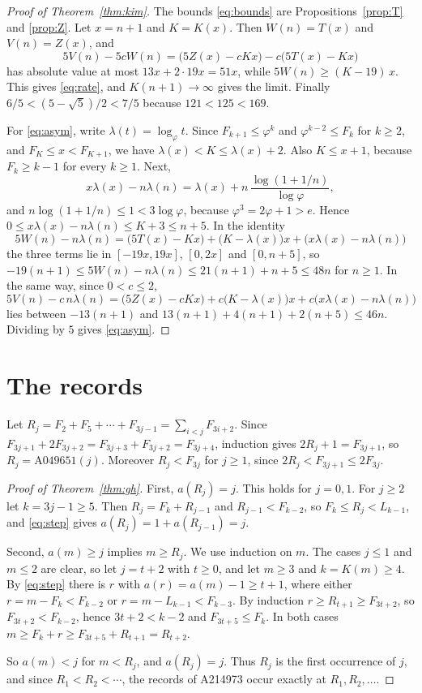\documentclass[]{interact}
\theoremstyle{plain}
\numberwithin{equation}{section}
\theoremstyle{definition}
\begin{document}
\begin{proof}[Proof of Theorem~\ref{thm:kim}]
The bounds \eqref{eq:bounds} are Propositions~\ref{prop:T} and \ref{prop:Z}. Let $x=n+1$ and $K=K(x)$. Then $W(n)=T(x)$ and $V(n)=Z(x)$, and
\[
5V(n)-5cW(n)=\bigl(5Z(x)-cKx\bigr)-c\bigl(5T(x)-Kx\bigr)
\]
has absolute value at most $13x+2\cdot19x=51x$, while $5W(n)\ge(K-19)\,x$. This gives \eqref{eq:rate}, and $K(n+1)\to\infty$ gives the limit. Finally $6/5<(5-\sqrt5)/2<7/5$ because $121<125<169$.

For \eqref{eq:asym}, write $\lambda(t)=\log_\varphi t$. Since $F_{k+1}\le\varphi^k$ and $\varphi^{k-2}\le F_k$ for $k\ge2$, and $F_K\le x<F_{K+1}$, we have $\lambda(x)<K\le\lambda(x)+2$. Also $K\le x+1$, because $F_k\ge k-1$ for every $k\ge1$. Next,
\[
x\lambda(x)-n\lambda(n)=\lambda(x)+n\,\frac{\log(1+1/n)}{\log\varphi},
\]
and $n\log(1+1/n)\le1<3\log\varphi$, because $\varphi^3=2\varphi+1>e$. Hence $0\le x\lambda(x)-n\lambda(n)\le K+3\le n+5$. In the identity
\[
5W(n)-n\lambda(n)=\bigl(5T(x)-Kx\bigr)+\bigl(K-\lambda(x)\bigr)x+\bigl(x\lambda(x)-n\lambda(n)\bigr)
\]
the three terms lie in $[-19x,19x]$, $[0,2x]$ and $[0,n+5]$, so $-19(n+1)\le 5W(n)-n\lambda(n)\le 21(n+1)+n+5\le 48n$ for $n\ge1$. In the same way, since $0<c\le2$,
\[
5V(n)-c\,n\lambda(n)=\bigl(5Z(x)-cKx\bigr)+c\bigl(K-\lambda(x)\bigr)x+c\bigl(x\lambda(x)-n\lambda(n)\bigr)
\]
lies between $-13(n+1)$ and $13(n+1)+4(n+1)+2(n+5)\le46n$. Dividing by $5$ gives \eqref{eq:asym}.
\end{proof}

\section{The records}\label{sec:records}

Let $R_j=F_2+F_5+\cdots+F_{3j-1}=\sum_{i<j}F_{3i+2}$. Since $F_{3j+1}+2F_{3j+2}=F_{3j+3}+F_{3j+2}=F_{3j+4}$, induction gives $2R_j+1=F_{3j+1}$, so $R_j=\mathrm{A049651}(j)$. Moreover $R_j<F_{3j}$ for $j\ge1$, since $2R_j<F_{3j+1}\le2F_{3j}$.

\begin{proof}[Proof of Theorem~\ref{thm:gh}]
First, $a(R_j)=j$. This holds for $j=0,1$. For $j\ge2$ let $k=3j-1\ge5$. Then $R_j=F_k+R_{j-1}$ and $R_{j-1}<F_{k-2}$, so $F_k\le R_j<L_{k-1}$, and \eqref{eq:step} gives $a(R_j)=1+a(R_{j-1})=j$.

Second, $a(m)\ge j$ implies $m\ge R_j$. We use induction on $m$. The cases $j\le1$ and $m\le2$ are clear, so let $j=t+2$ with $t\ge0$, and let $m\ge3$ and $k=K(m)\ge4$. By \eqref{eq:step} there is $r$ with $a(r)=a(m)-1\ge t+1$, where either $r=m-F_k<F_{k-2}$ or $r=m-L_{k-1}<F_{k-3}$. By induction $r\ge R_{t+1}\ge F_{3t+2}$, so $F_{3t+2}<F_{k-2}$, hence $3t+2<k-2$ and $F_{3t+5}\le F_k$. In both cases $m\ge F_k+r\ge F_{3t+5}+R_{t+1}=R_{t+2}$.

So $a(m)<j$ for $m<R_j$, and $a(R_j)=j$. Thus $R_j$ is the first occurrence of $j$, and since $R_1<R_2<\cdots$, the records of A214973 occur exactly at $R_1,R_2,\dots$.
\end{proof}
\end{document}
